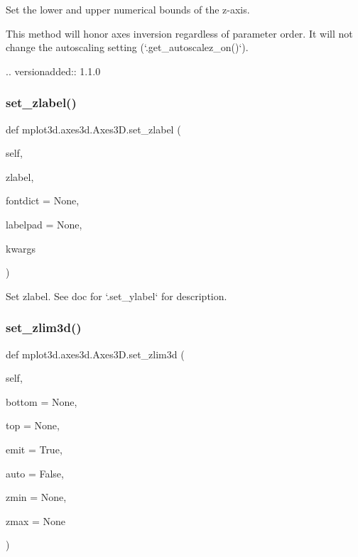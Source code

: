 \begin{DoxyVerb}
\begin{DoxyVerb}Set the lower and upper numerical bounds of the z-axis.

This method will honor axes inversion regardless of parameter order.
It will not change the autoscaling setting (`.get_autoscalez_on()`).

.. versionadded:: 1.1.0
\end{DoxyVerb}
 \mbox{\label{classmplot3d_1_1axes3d_1_1Axes3D_ab628b523ccfeebc76ca829168a5d99f2}} 
\subsubsection{\texorpdfstring{set\+\_\+zlabel()}{set\_zlabel()}}
{\footnotesize\ttfamily def mplot3d.\+axes3d.\+Axes3\+D.\+set\+\_\+zlabel (\begin{DoxyParamCaption}\item[{}]{self,  }\item[{}]{zlabel,  }\item[{}]{fontdict = {\ttfamily None},  }\item[{}]{labelpad = {\ttfamily None},  }\item[{}]{kwargs }\end{DoxyParamCaption})}

\begin{DoxyVerb}Set zlabel.  See doc for `.set_ylabel` for description.
\end{DoxyVerb}
 \mbox{\label{classmplot3d_1_1axes3d_1_1Axes3D_a7b4e4084d78b3229ef62b93ccda7f6c5}} 
\subsubsection{\texorpdfstring{set\+\_\+zlim3d()}{set\_zlim3d()}}
{\footnotesize\ttfamily def mplot3d.\+axes3d.\+Axes3\+D.\+set\+\_\+zlim3d (\begin{DoxyParamCaption}\item[{}]{self,  }\item[{}]{bottom = {\ttfamily None},  }\item[{}]{top = {\ttfamily None},  }\item[{}]{emit = {\ttfamily True},  }\item[{}]{auto = {\ttfamily False},  }\item[{}]{zmin = {\ttfamily None},  }\item[{}]{zmax = {\ttfamily None} }\end{DoxyParamCaption})}


\end{DoxyVerb}
